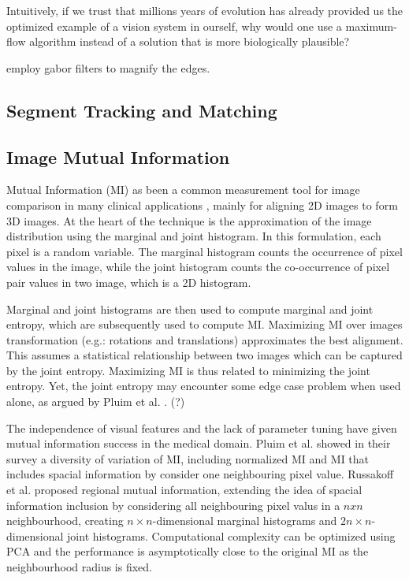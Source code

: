 \documentclass{article}
\begin{document}
Intuitively, if we trust that millions years of evolution has already provided us the optimized example of a vision system in ourself, why would one use a maximum-flow algorithm instead of a solution that is more biologically plausible?

employ gabor filters \cite{gabor} to magnify the edges. 


\subsection{Segment Tracking and Matching}



\subsection{Image Mutual Information}

Mutual Information (MI) as been a common measurement tool for image comparison in many clinical applications \cite{mi}, mainly for aligning 2D images to form 3D images. At the heart of the technique is the approximation of the image distribution using the marginal and joint histogram. In this formulation, each pixel is a random variable. The marginal histogram counts the occurrence of pixel values in the image, while the joint histogram counts the co-occurrence of pixel pair values in two image, which is a 2D histogram. 

Marginal and joint histograms are then used to compute marginal and joint entropy, which are subsequently used to compute MI. Maximizing MI over images transformation (e.g.: rotations and translations) approximates the best alignment. This assumes a statistical relationship between two images which can be captured by the joint entropy. Maximizing MI is thus related to minimizing the joint entropy. Yet, the joint entropy may encounter some edge case problem when used alone, as argued by Pluim et al. \cite{mi}. (?)

The independence of visual features and the lack of parameter tuning have given mutual information success in the medical domain. Pluim et al. showed in their survey a diversity of variation of MI, including normalized MI and MI that includes spacial information by consider one neighbouring pixel value. Russakoff et al. \cite{rmi} proposed regional mutual information, extending the idea of spacial information inclusion by considering all neighbouring pixel valus in a $nxn$ neighbourhood, creating $n\times n$-dimensional marginal histograms and $2n\times n$-dimensional joint histograms. Computational complexity can be optimized using PCA and the performance is asymptotically close to the original MI as the neighbourhood radius is fixed. 
\end{document}
